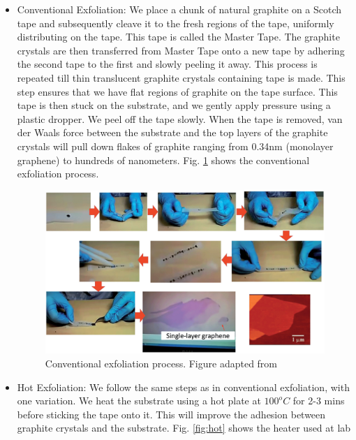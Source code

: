 \begin{itemize}
	\item Conventional Exfoliation:
	We place a chunk of natural graphite on a Scotch tape and subsequently cleave it to the fresh regions of the tape, uniformly distributing on the tape. This tape is called the Master Tape. The graphite crystals are then transferred from Master Tape onto a new tape by adhering the second tape to the first and slowly peeling it away. This process is repeated till thin translucent graphite crystals containing tape is made. This step ensures that we have flat regions of graphite on the tape surface. This tape is then stuck on the substrate, and we gently apply pressure using a plastic dropper. We peel off the tape slowly. When the tape is removed, van der Waals force between the substrate and the top layers of the graphite crystals will pull down flakes of graphite ranging from 0.34nm (monolayer graphene) to hundreds of nanometers. Fig. \ref{fig:exfo} shows the conventional exfoliation process.
	
	\begin{figure}[H]
		\centering
		\includegraphics[width=\linewidth]{figures/exfo.jpg}
		\caption{Conventional exfoliation process. Figure adapted from \cite{Yi2015}}
		\label{fig:exfo}
	\end{figure}
	
	\item Hot Exfoliation:
	We follow the same steps as in conventional exfoliation, with one variation. We heat the substrate using a hot plate at $100 ^o C$ for 2-3 mins before sticking the tape onto it. This will improve the adhesion between graphite crystals and the substrate. Fig. \ref{fig:hot} shows the heater used at lab
	

\end{itemize}
